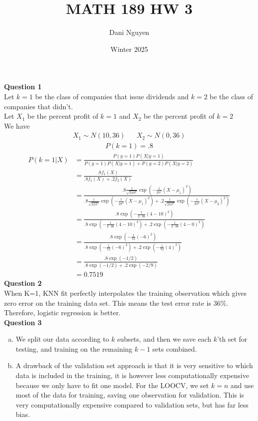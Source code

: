 \documentclass[12pt, letterpaper]{article}
\title{MATH 189 HW 3}
\author{Dani Nguyen}
\date{Winter 2025}
\begin{document}
\maketitle
\graphicspath{ {./} }

\noindent \textbf{Question 1} \\
Let $k = 1$ be the class of companies that issue dividends and $k=2$ be the class 
of companies that didn't. \\
Let $X_1$ be the percent profit of $k=1$ and $X_2$ be the percent profit of $k=2$ \\
We have
\begin{align*}
    X_1 \sim N(10,36) && X_2 \sim N(0,36)
\end{align*}
\begin{align*}
    P(k=1) = .8
\end{align*}
\begin{align*}
    P(k=1 | X) &= \frac{P( y = 1 ) P(X | y = 1)}{P( y = 1 ) P(X | y = 1) + P( y = 2 ) P(X | y = 2)} \\
    &= \frac{.8 f_1(X)}{.8 f_1(X) + .2 f_2(X)} \\
    &= \frac{.8 \frac{1}{\sqrt{2\pi\sigma^2}} \exp (-\frac{1}{2\sigma^2}(X-\mu_1)^2)}{.8 \frac{1}{\sqrt{2\pi\sigma^2}} \exp (-\frac{1}{2\sigma^2}(X-\mu_1)^2) + .2 \frac{1}{\sqrt{2\pi\sigma^2}} \exp (-\frac{1}{2\sigma^2}(X-\mu_2)^2)} \\
    &= \frac{.8 \exp (-\frac{1}{2\cdot 36}(4-10)^2)}{.8 \exp (-\frac{1}{2\cdot 36}(4-10)^2) + .2 \exp (-\frac{1}{2\cdot 36}(4-0)^2)} \\
    &= \frac{.8 \exp (-\frac{1}{72}(-6)^2)}{.8 \exp (-\frac{1}{72}(-6)^2) + .2 \exp (-\frac{1}{72}(4)^2)} \\
    &= \frac{.8 \exp (-1/2)}{.8 \exp (-1/2) + .2 \exp (-2/9)} \\
    &= 0.7519
\end{align*}
\noindent \textbf{Question 2} \\
When K=1, KNN fit perfectly interpolates the training observation which gives 
zero error on the training data set. This means the test error rate is 36\%. 
Therefore, logistic regression is better. \\

\noindent \textbf{Question 3} 
\begin{enumerate}[a.]
    \item We split our data according to $k$ subsets, and then we save each 
    $k$'th set for testing, and training on the remaining $k-1$ sets combined.
    \item A drawback of the validation set approach is that it is very sensitive 
    to which data is included in the training, it is however less computationally 
    expensive because we only have to fit one model. For the LOOCV, we set $k=n$
    and use most of the data for training, saving one observation for validation.
    This is very computationally expensive compared to validation sets, but has
    far less bias.
\end{enumerate}
\end{document}
